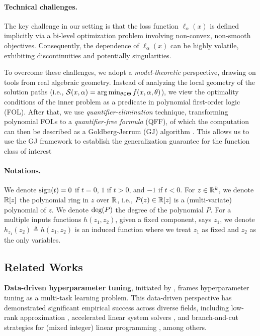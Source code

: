 \documentclass{article}
\theoremstyle{plain}
\theoremstyle{definition}
\theoremstyle{remark}
\begin{document}
\paragraph{Technical challenges.} The key challenge in our setting is that the loss function $\ell_\alpha(x)$ is defined implicitly via a bi-level optimization problem involving non-convex, non-smooth objectives. Consequently, the dependence of $\ell_\alpha(x)$ can be highly volatile, exhibiting discontinuities and potentially singularities. 


To overcome these challenges, we adopt a \textit{model-theoretic} perspective, drawing on tools from real algebraic geometry. Instead of analyzing the local geometry of the solution paths (i.e., $\mathcal{S}(x, \alpha) = \arg \min_{\theta \in \Theta}f(x, \alpha, \theta)$), we view the optimality conditions of the inner problem as a predicate in polynomial first-order logic (FOL). After that, we use \textit{quantifier-elimination} technique, transforming polynomial FOLs to a \textit{quantifier-free formula} (QFF), of which the computation can then be described as a Goldberg-Jerrum (GJ) algorithm \citep{goldberg1993bounding, bartlett2022generalization}. This allows us to use the GJ framework to establish the generalization guarantee for the function class of interest


\paragraph{Notations.} We denote ${\text{sign}}(t) = 0$ if $t = 0$, $1$ if $t > 0$, and $-1$ if $t < 0$. For $z \in \mathbb{R}^k$, we denote $\mathbb{R}[z]$ the polynomial ring in $z$ over $\mathbb{R}$, i.e., $P(z) \in \mathbb{R}[z]$ is a (multi-variate) polynomial of $z$. We denote $\textup{deg}(P)$ the degree of the polynomial $P$. For a multiple inputs functions $h(z_1, z_2)$, given a fixed component, says $z_1$, we denote $h_{z_1}(z_2) \triangleq h(z_1, z_2)$ is an induced function where we treat $z_1$ as fixed and $z_2$ as the only variables.  

\subsection{Related Works}

\textbf{Data-driven hyperparameter tuning}, initiated by \citep{balcan2020data, gupta2020data}, frames hyperparameter tuning as a multi-task learning problem. This data-driven perspective has demonstrated significant empirical success across diverse fields, including low-rank approximation \citep{li2023learning, indyk2019learning}, accelerated linear system solvers \citep{sakaue2024generalization, nguyen2026provably}, and branch-and-cut strategies for (mixed integer) linear programming \citep{balcan2021sample}, among others.  
\end{document}
